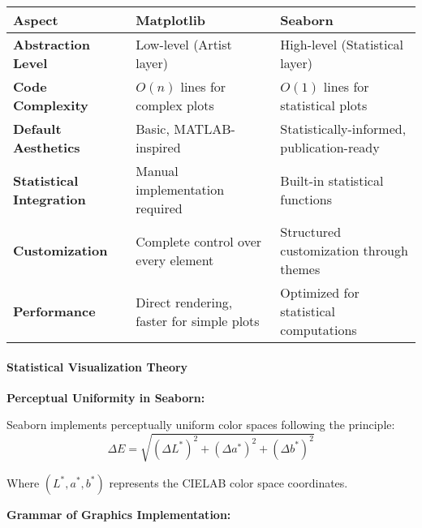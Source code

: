 \documentclass[11pt]{article}
\begin{document}
\begin{longtable}[]{@{}
  >{\raggedright\arraybackslash}p{}
  >{\raggedright\arraybackslash}p{}
  >{\raggedright\arraybackslash}p{}@{}}
\toprule\noalign{}
\begin{minipage}[b]{\linewidth}\raggedright
\textbf{Aspect}
\end{minipage} & \begin{minipage}[b]{\linewidth}\raggedright
\textbf{Matplotlib}
\end{minipage} & \begin{minipage}[b]{\linewidth}\raggedright
\textbf{Seaborn}
\end{minipage} \\
\midrule\noalign{}
\endhead
\bottomrule\noalign{}
\endlastfoot
\textbf{Abstraction Level} & Low-level (Artist layer) & High-level
(Statistical layer) \\
\textbf{Code Complexity} & \(O(n)\) lines for complex plots & \(O(1)\)
lines for statistical plots \\
\textbf{Default Aesthetics} & Basic, MATLAB-inspired &
Statistically-informed, publication-ready \\
\textbf{Statistical Integration} & Manual implementation required &
Built-in statistical functions \\
\textbf{Customization} & Complete control over every element &
Structured customization through themes \\
\textbf{Performance} & Direct rendering, faster for simple plots &
Optimized for statistical computations \\
\end{longtable}

\paragraph{Statistical Visualization
Theory}\label{statistical-visualization-theory}

\textbf{Perceptual Uniformity in Seaborn:}

Seaborn implements perceptually uniform color spaces following the
principle:
\[\Delta E = \sqrt{(\Delta L^*)^2 + (\Delta a^*)^2 + (\Delta b^*)^2}\]

Where \((L^*, a^*, b^*)\) represents the CIELAB color space coordinates.

\textbf{Grammar of Graphics Implementation:}
\end{document}
